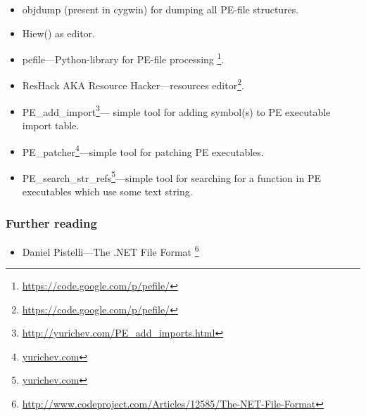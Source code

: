 \begin{itemize}
\item objdump (present in cygwin) for dumping all PE-file structures.

\item Hiew() as editor.

\item pefile---Python-library for PE-file processing \footnote{\url{https://code.google.com/p/pefile/}}.

\item ResHack \acs{AKA} Resource Hacker---resources editor\footnote{\url{https://code.google.com/p/pefile/}}.

\item PE\_add\_import\footnote{\url{http://yurichev.com/PE_add_imports.html}}---
simple tool for adding symbol(s) to PE executable import table.

\item PE\_patcher\footnote{\href{http://yurichev.com/PE_patcher.html}{yurichev.com}}---simple tool for patching PE executables.

\item PE\_search\_str\_refs\footnote{\href{http://yurichev.com/PE_search_str_refs.html}{yurichev.com}}---simple tool for searching for a function in PE executables which use some text string.
\end{itemize}

\subsubsection{Further reading}

\begin{itemize}
\item Daniel Pistelli---The .NET File Format \footnote{\url{http://www.codeproject.com/Articles/12585/The-NET-File-Format}}
\end{itemize}

